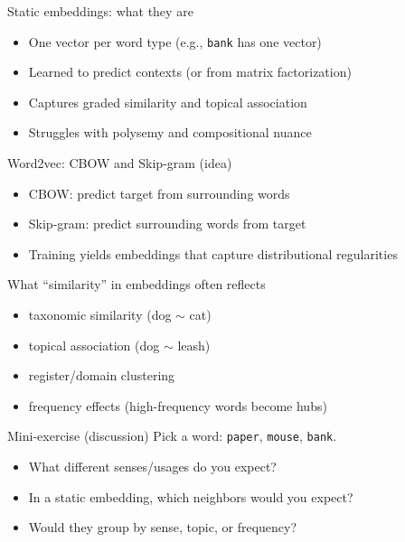\documentclass{beamer}
\begin{document}
\begin{frame}{Static embeddings: what they are}
\begin{itemize}
  \item One vector per word type (e.g., \texttt{bank} has one vector)
  \item Learned to predict contexts (or from matrix factorization)
  \item Captures graded similarity and topical association
  \item Struggles with polysemy and compositional nuance
\end{itemize}
\end{frame}

\begin{frame}{Word2vec: CBOW and Skip-gram (idea)}
\begin{itemize}
  \item CBOW: predict target from surrounding words
  \item Skip-gram: predict surrounding words from target
  \item Training yields embeddings that capture distributional regularities
\end{itemize}
\end{frame}

\begin{frame}{What ``similarity'' in embeddings often reflects}
\begin{itemize}
  \item taxonomic similarity (dog $\sim$ cat)
  \item topical association (dog $\sim$ leash)
  \item register/domain clustering
  \item frequency effects (high-frequency words become hubs)
\end{itemize}
\end{frame}

\begin{frame}{Mini-exercise (discussion)}
Pick a word: \texttt{paper}, \texttt{mouse}, \texttt{bank}.
\begin{itemize}
  \item What different senses/usages do you expect?
  \item In a static embedding, which neighbors would you expect?
  \item Would they group by sense, topic, or frequency?
\end{itemize}
\end{frame}
\end{document}
